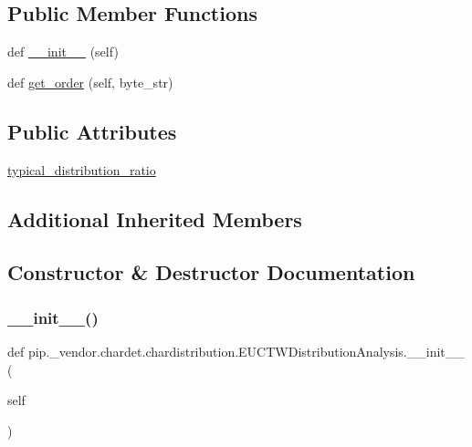\subsection*{Public Member Functions}
\begin{DoxyCompactItemize}
\item 
def \hyperlink{classpip_1_1__vendor_1_1chardet_1_1chardistribution_1_1EUCTWDistributionAnalysis_ac9c97a5f1d60c894b06c4f70603792d4}{\+\_\+\+\_\+init\+\_\+\+\_\+} (self)
\item 
def \hyperlink{classpip_1_1__vendor_1_1chardet_1_1chardistribution_1_1EUCTWDistributionAnalysis_a705ca817ec9a199ced42faab62427bd4}{get\+\_\+order} (self, byte\+\_\+str)
\end{DoxyCompactItemize}
\subsection*{Public Attributes}
\begin{DoxyCompactItemize}
\item 
\hyperlink{classpip_1_1__vendor_1_1chardet_1_1chardistribution_1_1EUCTWDistributionAnalysis_a04a09f265c5b3e71aaa25bdbe0940d90}{typical\+\_\+distribution\+\_\+ratio}
\end{DoxyCompactItemize}
\subsection*{Additional Inherited Members}


\subsection{Constructor \& Destructor Documentation}
\mbox{\label{classpip_1_1__vendor_1_1chardet_1_1chardistribution_1_1EUCTWDistributionAnalysis_ac9c97a5f1d60c894b06c4f70603792d4}} 
\subsubsection{\texorpdfstring{\+\_\+\+\_\+init\+\_\+\+\_\+()}{\_\_init\_\_()}}
{\footnotesize\ttfamily def pip.\+\_\+vendor.\+chardet.\+chardistribution.\+E\+U\+C\+T\+W\+Distribution\+Analysis.\+\_\+\+\_\+init\+\_\+\+\_\+ (\begin{DoxyParamCaption}\item[{}]{self }\end{DoxyParamCaption})}



